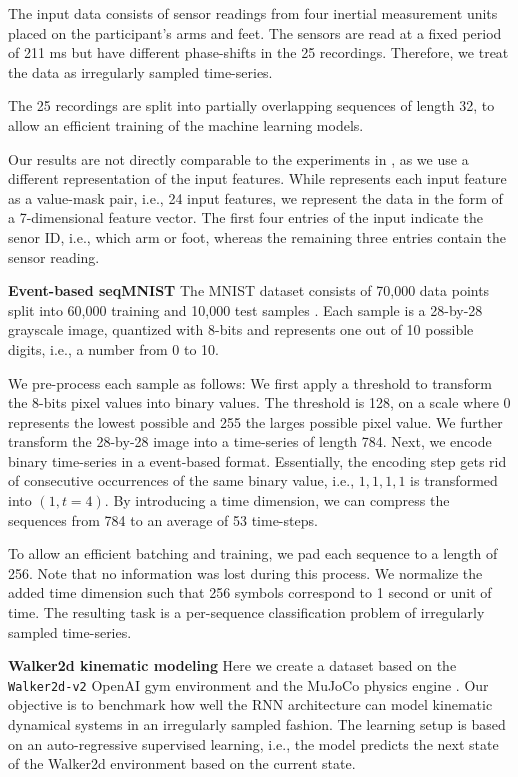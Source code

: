 \documentclass{article}
\begin{document}
The input data consists of sensor readings from four inertial measurement units placed on the participant's arms and feet.
The sensors are read at a fixed period of 211 ms but have different phase-shifts in the 25 recordings. Therefore, we treat the data as irregularly sampled time-series.

The 25 recordings are split into partially overlapping sequences of length 32, to allow an efficient training of the machine learning models. 

Our results are not directly comparable to the experiments in \cite{rubanova2019latent}, as we use a different representation of the input features. While \cite{rubanova2019latent} represents each input feature as a value-mask pair, i.e., 24 input features, we represent the data in the form of a 7-dimensional feature vector.
The first four entries of the input indicate the senor ID, i.e., which arm or foot, whereas the remaining three entries contain the sensor reading.

\textbf{Event-based seqMNIST}
The MNIST dataset consists of 70,000 data points split into 60,000 training and 10,000 test samples \cite{lecun1998gradient}. 
Each sample is a 28-by-28 grayscale image, quantized with 8-bits and represents one out of 10 possible digits, i.e., a number from 0 to 10.

We pre-process each sample as follows:
We first apply a threshold to transform the 8-bits pixel values into binary values. The threshold is 128, on a scale where 0 represents the lowest possible and 255 the larges possible pixel value.
We further transform the 28-by-28 image into a time-series of length 784. 
Next, we encode binary time-series in a event-based format. Essentially, the encoding step gets rid of consecutive occurrences of the same binary value, i.e., $1,1,1,1$ is transformed into $(1,t=4)$.
By introducing a time dimension, we can compress the sequences from 784 to an average of 53 time-steps.

To allow an efficient batching and training, we pad each sequence to a length of 256. Note that no information was lost during this process.
We normalize the added time dimension such that 256 symbols correspond to 1 second or unit of time.
The resulting task is a per-sequence classification problem of irregularly sampled time-series.

\textbf{Walker2d kinematic modeling}
Here we create a dataset based on the \texttt{Walker2d-v2} OpenAI gym \cite{gym} environment and the MuJoCo physics engine \cite{todorov2012mujoco}.
Our objective is to benchmark how well the RNN architecture can model kinematic dynamical systems in an irregularly sampled fashion.
The learning setup is based on an auto-regressive supervised learning, i.e., the model predicts the next state of the Walker2d environment based on the current state.
\end{document}
